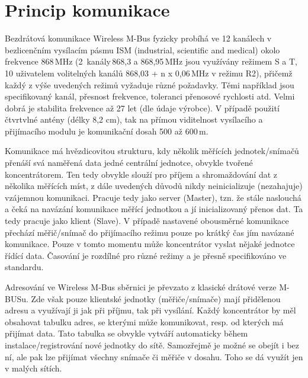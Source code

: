 
\section{Princip komunikace}

Bezdrátová komunikace Wireless M-Bus fyzicky probíhá ve 12 kanálech v bezlicenčním vysílacím pásmu ISM (industrial, scientific and medical) okolo frekvence 868\,MHz (2~kanály\,868,3 a 868,95\,MHz jsou využívány režimem S a T, 10 uživatelem volitelných kanálů 868,03 + n x 0,06\,MHz v režimu R2), přičemž každý z výše uvedených režimů vyžaduje různé požadavky. Těmi například jsou specifikovaný kanál, přesnost frekvence, toleranci přenosové rychlosti atd. Velmi dobrá je stabilita frekvence až 27 let (dle údaje výrobce). V případě použití čtvrtvlné antény (délky 8,2 cm), tak na přímou viditelnost vysílacího a přijímacího modulu je komunikační dosah 500 až 600\,m.

Komunikace má hvězdicovitou strukturu, kdy několik měřících jednotek/snímačů přenáší svá naměřená data jedné centrální jednotce, obvykle tvořené koncentrátorem. Ten tedy obvykle slouží pro příjem a shromaždování dat z několika měřících míst, z dále uvedených důvodů nikdy neinicializuje (nezahajuje) vzájemnou komunikaci. Pracuje tedy jako server (Master), tzn. že stále naslouchá a čeká na navázání komunikace měřící jednotkou a jí inicializovaný přenos dat. Ta tedy pracuje jako klient (Slave). V případě nastavené obousměrné komunikace přechází měřič/snímač do přijímacího režimu pouze po krátký čas jím navázané komunikace. Pouze v tomto momentu může koncentrátor vyslat nějaké jednotce řídící data. Časování je rozdílné pro různé režimy a je přesně specifikováno ve standardu.

Adresování ve Wireless M-Bus sběrnici je převzato z klasické drátové verze M-BUSu. Zde však pouze klientské jednotky (měřiče/snímače) mají přidělenou adresu a využívají ji jak při příjmu, tak při vysílání. Každý koncentrátor by měl obsahovat tabulku adres, se kterými může komunikovat, resp. od kterých má přijímat data. Tato tabulka se obvykle vytváří automaticky během instalace/registrování nové jednotky do sítě. Samozřejmě je možné se obejít i bez ní, ale pak lze přijímat všechny snímače či měřiče v dosahu. Toho se dá využít jen v malých sítích. 

